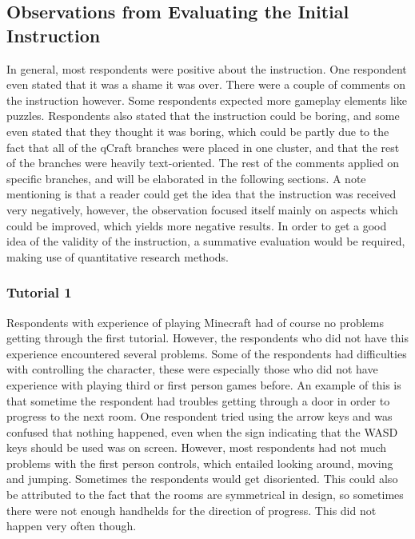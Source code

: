 \documentclass[11pt,twoside]{report} %
\begin{document}
\subsection{Observations from Evaluating the Initial Instruction}

In general, most respondents were positive about the instruction. One respondent even stated that it was a shame it was over. There were a couple of comments on the instruction however. Some respondents expected more gameplay elements like puzzles. Respondents also stated that the instruction could be boring, and some even stated that they thought it was boring, which could be partly due to the fact that all of the qCraft branches were placed in one cluster, and that the rest of the branches were heavily text-oriented. The rest of the comments applied on specific branches, and will be elaborated in the following sections. A note mentioning is that a reader could get the idea that the instruction was received very negatively, however, the observation focused itself mainly on aspects which could be improved, which yields more negative results. In order to get a good idea of the validity of the instruction, a summative evaluation would be required, making use of quantitative research methods.

\subsubsection{Tutorial 1}

Respondents with experience of playing Minecraft had of course no problems getting through the first tutorial. However, the respondents who did not have this experience encountered several problems. Some of the respondents had difficulties with controlling the character, these were especially those who did not have experience with playing third or first person games before. An example of this is that sometime the respondent had troubles getting through a door in order to progress to the next room. One respondent tried using the arrow keys and was confused that nothing happened, even when the sign indicating that the WASD keys should be used was on screen. However, most respondents had not much problems with the first person controls, which entailed looking around, moving and jumping. Sometimes the respondents would get disoriented. This could also be attributed to the fact that the rooms are symmetrical in design, so sometimes there were not enough handhelds for the direction of progress. This did not happen very often though.
\end{document}
